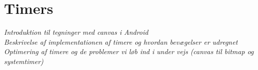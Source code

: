 \section{Timers}
\textit{Introduktion til tegninger med canvas i Android\\
Beskrivelse af implementationen af timere og hvordan bevægelser er udregnet\\
Optimering af timere og de problemer vi løb ind i under vejs (canvas til bitmap og systemtimer)}